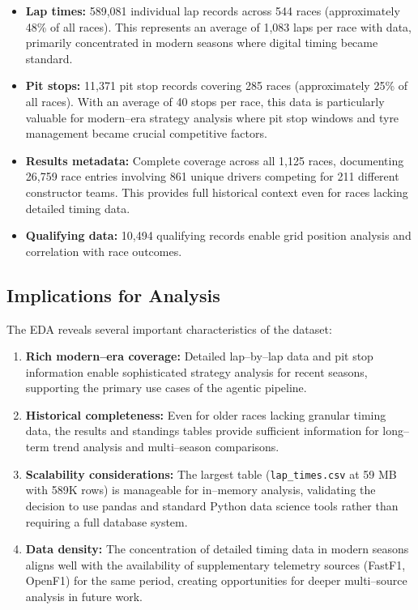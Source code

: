 \documentclass[11pt]{article}
\begin{document}
\begin{itemize}[leftmargin=1.5em]
    \item \textbf{Lap times:} 589,081 individual lap records across 544 races (approximately 48\% of all races). This represents an average of 1,083 laps per race with data, primarily concentrated in modern seasons where digital timing became standard.
    
    \item \textbf{Pit stops:} 11,371 pit stop records covering 285 races (approximately 25\% of all races). With an average of 40 stops per race, this data is particularly valuable for modern--era strategy analysis where pit stop windows and tyre management became crucial competitive factors.
    
    \item \textbf{Results metadata:} Complete coverage across all 1,125 races, documenting 26,759 race entries involving 861 unique drivers competing for 211 different constructor teams. This provides full historical context even for races lacking detailed timing data.
    
    \item \textbf{Qualifying data:} 10,494 qualifying records enable grid position analysis and correlation with race outcomes.
\end{itemize}

\subsection{Implications for Analysis}

The EDA reveals several important characteristics of the dataset:

\begin{enumerate}[leftmargin=1.5em]
    \item \textbf{Rich modern--era coverage:} Detailed lap--by--lap data and pit stop information enable sophisticated strategy analysis for recent seasons, supporting the primary use cases of the agentic pipeline.
    
    \item \textbf{Historical completeness:} Even for older races lacking granular timing data, the results and standings tables provide sufficient information for long--term trend analysis and multi--season comparisons.
    
    \item \textbf{Scalability considerations:} The largest table (\texttt{lap\_times.csv} at 59 MB with 589K rows) is manageable for in--memory analysis, validating the decision to use pandas and standard Python data science tools rather than requiring a full database system.
    
    \item \textbf{Data density:} The concentration of detailed timing data in modern seasons aligns well with the availability of supplementary telemetry sources (FastF1, OpenF1) for the same period, creating opportunities for deeper multi--source analysis in future work.
\end{enumerate}
\end{document}
